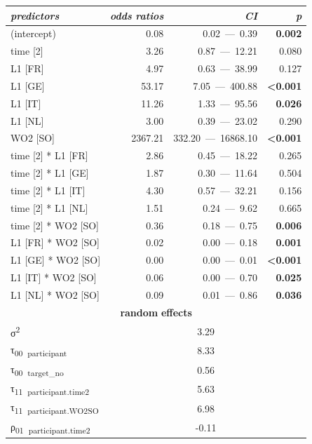 \begin{table}
    \begin{tabularx}{\textwidth}{Xrrr}
    \lsptoprule
    \textit{predictors} & \textit{odds} \textit{ratios} & \textit{CI} & \textit{p}\\
    \midrule
    (intercept) & 0.08 & 0.02~—~0.39 & \textbf{0.002}\\
    time [2] & 3.26 & 0.87~—~12.21 & 0.080\\
    L1 [FR] & 4.97 & 0.63~—~38.99 & 0.127\\
    L1 [GE] & 53.17 & 7.05~—~400.88 & \textbf{<0.001}\\
    L1 [IT] & 11.26 & 1.33~—~95.56 & \textbf{0.026}\\
    L1 [NL] & 3.00 & 0.39~—~23.02 & 0.290\\
    WO2 [SO] & 2367.21 & 332.20~—~16868.10 & \textbf{<0.001}\\
    time [2] * L1 [FR] & 2.86 & 0.45~—~18.22 & 0.265\\
    time [2] * L1 [GE] & 1.87 & 0.30~—~11.64 & 0.504\\
    time [2] * L1 [IT] & 4.30 & 0.57~—~32.21 & 0.156\\
    time [2] * L1 [NL] & 1.51 & 0.24~—~9.62 & 0.665\\
    time [2] * WO2 [SO] & 0.36 & 0.18~—~0.75 & \textbf{0.006}\\
    L1 [FR] * WO2 [SO] & 0.02 & 0.00~—~0.18 & \textbf{0.001}\\
    L1 [GE] * WO2 [SO] & 0.00 & 0.00~—~0.01 & \textbf{<0.001}\\
    L1 [IT] * WO2 [SO] & 0.06 & 0.00~—~0.70 & \textbf{0.025}\\
    L1 [NL] * WO2 [SO] & 0.09 & 0.01~—~0.86 & \textbf{0.036}\\
    \multicolumn{4}{c}{\textbf{random} \textbf{effects}}\\
    σ\textsuperscript{2} & \multicolumn{3}{c}{3.29}\\
    τ\textsubscript{00}~\textsubscript{participant} & \multicolumn{3}{c}{8.33}\\
    τ\textsubscript{00}~\textsubscript{target\_no} & \multicolumn{3}{c}{0.56}\\
    τ\textsubscript{11}~\textsubscript{participant.time2} & \multicolumn{3}{c}{5.63}\\
    τ\textsubscript{11}~\textsubscript{participant.WO2SO} & \multicolumn{3}{c}{6.98}\\
    ρ\textsubscript{01}~\textsubscript{participant.time2} & \multicolumn{3}{c}{{}-0.11}\\

\end{tabularx}
\end{table}
